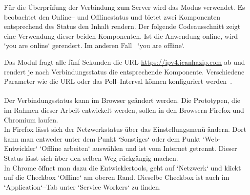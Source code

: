 Für die Überprüfung der Verbindung zum Server wird das Modus  verwendet. Es beobachtet den Online-- und Offlinestatus und bietet zwei Komponenten entsprechend des Status den Inhalt rendern. Der folgende Codeausschnitt zeigt eine Verwendung dieser beiden Komponenten. Ist die Anwendung online, wird `you are online` gerendert. Im anderen Fall ~`you are offline`.
%
\begin{center}

\end{center}
%
Das Modul fragt alle fünf Sekunden die URL \url{https://ipv4.icanhazip.com} ab und rendert je nach Verbindungsstatus die entsprechende Komponente. Verschiedene Parameter wie die URL oder das Poll--Interval können konfiguriert werden~\cite{react-detect}.\\\\
%
Der Verbindungsstatus kann im Browser geändert werden. Die Prototypen, die im Rahmen dieser Arbeit entwickelt werden, sollen in den Browsern Firefox und Chromium laufen.\\
In Firefox lässt sich der Netzwerkstatus über das Einstellungsmenü ändern. Dort kann man entweder unter dem Punkt `Sonstiges` oder dem Punkt `Web-Entwickler` `Offline arbeiten` auswählen und ist vom Internet getrennt. Dieser Status lässt sich über den selben Weg rückgängig machen.\\
In Chrome öffnet man dazu die Entwicklertools, geht auf `Netzwerk` und klickt auf die Checkbox `Offline` am oberen Rand. Dieselbe Checkbox ist auch im `Application`--Tab unter `Service Workers` zu finden.